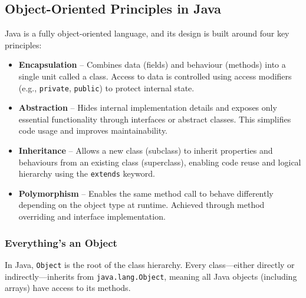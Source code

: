 \documentclass{article}
\begin{document}
\subsection{Object-Oriented Principles in Java}

Java is a fully object-oriented language, and its design is built around four key principles:

\begin{itemize}
    \item \textbf{Encapsulation} – Combines data (fields) and behaviour (methods) into a single unit called a class. Access to data is controlled using access modifiers (e.g., \texttt{private}, \texttt{public}) to protect internal state.
    
    \item \textbf{Abstraction} – Hides internal implementation details and exposes only essential functionality through interfaces or abstract classes. This simplifies code usage and improves maintainability.
    
    \item \textbf{Inheritance} – Allows a new class (subclass) to inherit properties and behaviours from an existing class (superclass), enabling code reuse and logical hierarchy using the \texttt{extends} keyword.
    
    \item \textbf{Polymorphism} – Enables the same method call to behave differently depending on the object type at runtime. Achieved through method overriding and interface implementation.
\end{itemize}

\subsubsection{Everything's an Object}

In Java, \texttt{Object} is the root of the class hierarchy. Every class—either directly or indirectly—inherits from \texttt{java.lang.Object}, meaning all Java objects (including arrays) have access to its methods.
\end{document}
